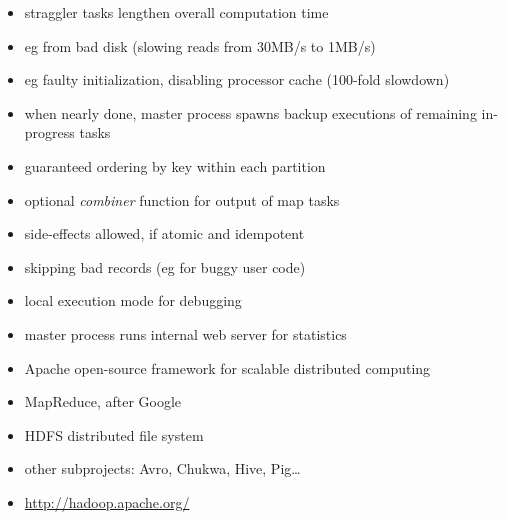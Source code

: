 \documentclass{sepslide-soa}
\begin{document}
\begin{slide}
\begin{itemize}
\item straggler tasks lengthen overall computation time
\item eg from bad disk (slowing reads from 30MB/s to 1MB/s)
\item eg faulty initialization, disabling processor cache (100-fold slowdown)
\item when nearly done, master process spawns backup executions of remaining in-progress tasks
\end{itemize}
\end{slide}

\begin{slide}
\begin{itemize}
\item guaranteed ordering by key within each partition
\item optional \emph{combiner} function for output of map tasks
\item side-effects allowed, if atomic and idempotent
\item skipping bad records (eg for buggy user code)
\item local execution mode for debugging
\item master process runs internal web server for statistics
\end{itemize}
\end{slide}

\begin{slide}
\begin{itemize}
\item Apache open-source framework for scalable distributed computing
\item MapReduce, after Google
\item HDFS distributed file system
\item other subprojects: Avro, Chukwa, Hive, Pig\ldots
\item \url{http://hadoop.apache.org/}
\end{itemize}
\end{slide}
\end{document}
